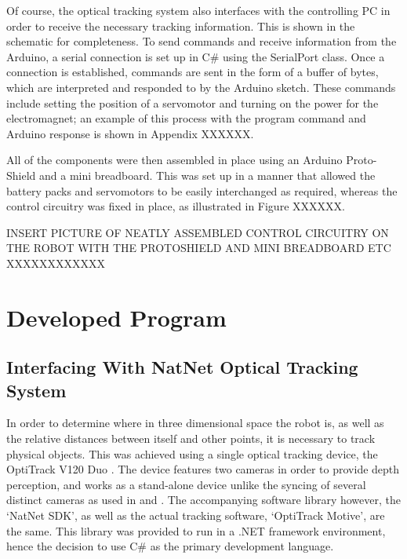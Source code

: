 \documentclass[11pt]{article}
\begin{document}
Of course, the optical tracking system also interfaces with the controlling PC in order to receive the necessary tracking information. This is shown in the schematic for completeness. To send commands and receive information from the Arduino, a serial connection is set up in C\# using the SerialPort class. Once a connection is established, commands are sent in the form of a buffer of bytes, which are interpreted and responded to by the Arduino sketch. These commands include setting the position of a servomotor and turning on the power for the electromagnet; an example of this process with the program command and Arduino response is shown in Appendix XXXXXX.

All of the components were then assembled in place using an Arduino Proto-Shield and a mini breadboard. This was set up in a manner that allowed the battery packs and servomotors to be easily interchanged as required, whereas the control circuitry was fixed in place, as illustrated in Figure XXXXXX.

INSERT PICTURE OF NEATLY ASSEMBLED CONTROL CIRCUITRY ON THE ROBOT WITH THE PROTOSHIELD AND MINI BREADBOARD ETC XXXXXXXXXXXX

\pagebreak
\section{Developed Program}

\subsection{Interfacing With NatNet Optical Tracking System}
\label{section:natnet}
In order to determine where in three dimensional space the robot is, as well as the relative distances between itself and other points, it is necessary to track physical objects. This was achieved using a single optical tracking device, the OptiTrack V120 Duo \cite{OptiTrackSite}. The device features two cameras in order to provide depth perception, and works as a stand-alone device unlike the syncing of several distinct cameras as used in \cite{GreggSmithDesign} and \cite{GreggSmithFeedback}. The accompanying software library however, the `NatNet SDK', as well as the actual tracking software, `OptiTrack Motive', are the same. This library was provided to run in a .NET framework environment, hence the decision to use C\# as the primary development language.
\end{document}

